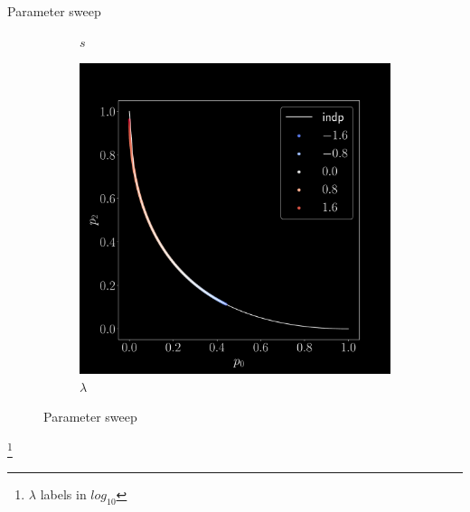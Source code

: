 \documentclass[aspectratio=169,9pt]{beamer}
\begin{document}
\begin{frame}{Parameter sweep}
\begin{figure}[h]
\begin{adjustwidth}{-7cm}{-7cm}
\begin{subfigure}[b]{0.2\textwidth}
        \caption{$s$}
      \end{subfigure}\pause
      \begin{subfigure}[b]{0.2\textwidth}
        \centering
        \includegraphics[width=\textwidth]{sweep-l}
        \caption{$\lambda$}
      \end{subfigure}
    \end{adjustwidth}
    \pause[-1]\caption{Parameter sweep}
  \end{figure}
  \footnote{$\lambda$ labels in $log_{10}$}
\end{frame}
\end{document}
